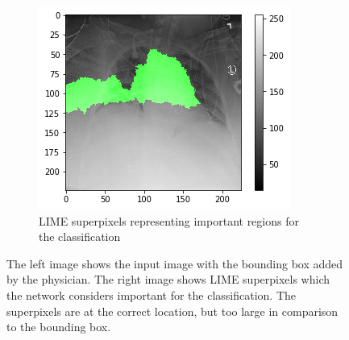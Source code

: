 \begin{figure}[H]
\begin{subfigure}[t]{.45\textwidth}
        \includegraphics[width=\linewidth]{chapters/03_classification/images/lime_0.png}
        \caption{LIME superpixels representing important regions for the classification}
    \end{subfigure}
    \caption{The left image shows the input image with the bounding box added by the physician. The right image shows LIME superpixels which the network considers important for the classification. The superpixels are at the correct location, but too large in comparison to the bounding box.}
    \label{lime_example_1}
\end{figure}

